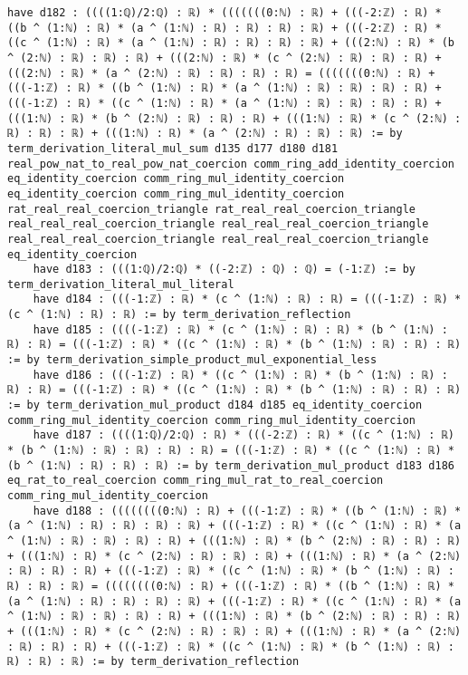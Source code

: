 \documentclass{article}
\begin{document}
\begin{tcolorbox}[colback=white!10, width=\linewidth]
\begin{lstlisting}[language=Lean4]
    have d182 : ((((1:ℚ)/2:ℚ) : ℝ) * (((((((0:ℕ) : ℝ) + (((-2:ℤ) : ℝ) * ((b ^ (1:ℕ) : ℝ) * (a ^ (1:ℕ) : ℝ) : ℝ) : ℝ) : ℝ) + (((-2:ℤ) : ℝ) * ((c ^ (1:ℕ) : ℝ) * (a ^ (1:ℕ) : ℝ) : ℝ) : ℝ) : ℝ) + (((2:ℕ) : ℝ) * (b ^ (2:ℕ) : ℝ) : ℝ) : ℝ) + (((2:ℕ) : ℝ) * (c ^ (2:ℕ) : ℝ) : ℝ) : ℝ) + (((2:ℕ) : ℝ) * (a ^ (2:ℕ) : ℝ) : ℝ) : ℝ) : ℝ) = (((((((0:ℕ) : ℝ) + (((-1:ℤ) : ℝ) * ((b ^ (1:ℕ) : ℝ) * (a ^ (1:ℕ) : ℝ) : ℝ) : ℝ) : ℝ) + (((-1:ℤ) : ℝ) * ((c ^ (1:ℕ) : ℝ) * (a ^ (1:ℕ) : ℝ) : ℝ) : ℝ) : ℝ) + (((1:ℕ) : ℝ) * (b ^ (2:ℕ) : ℝ) : ℝ) : ℝ) + (((1:ℕ) : ℝ) * (c ^ (2:ℕ) : ℝ) : ℝ) : ℝ) + (((1:ℕ) : ℝ) * (a ^ (2:ℕ) : ℝ) : ℝ) : ℝ) := by term_derivation_literal_mul_sum d135 d177 d180 d181 real_pow_nat_to_real_pow_nat_coercion comm_ring_add_identity_coercion eq_identity_coercion comm_ring_mul_identity_coercion eq_identity_coercion comm_ring_mul_identity_coercion rat_real_real_coercion_triangle rat_real_real_coercion_triangle real_real_real_coercion_triangle real_real_real_coercion_triangle real_real_real_coercion_triangle real_real_real_coercion_triangle eq_identity_coercion
    have d183 : (((1:ℚ)/2:ℚ) * ((-2:ℤ) : ℚ) : ℚ) = (-1:ℤ) := by term_derivation_literal_mul_literal
    have d184 : (((-1:ℤ) : ℝ) * (c ^ (1:ℕ) : ℝ) : ℝ) = (((-1:ℤ) : ℝ) * (c ^ (1:ℕ) : ℝ) : ℝ) := by term_derivation_reflection
    have d185 : ((((-1:ℤ) : ℝ) * (c ^ (1:ℕ) : ℝ) : ℝ) * (b ^ (1:ℕ) : ℝ) : ℝ) = (((-1:ℤ) : ℝ) * ((c ^ (1:ℕ) : ℝ) * (b ^ (1:ℕ) : ℝ) : ℝ) : ℝ) := by term_derivation_simple_product_mul_exponential_less
    have d186 : (((-1:ℤ) : ℝ) * ((c ^ (1:ℕ) : ℝ) * (b ^ (1:ℕ) : ℝ) : ℝ) : ℝ) = (((-1:ℤ) : ℝ) * ((c ^ (1:ℕ) : ℝ) * (b ^ (1:ℕ) : ℝ) : ℝ) : ℝ) := by term_derivation_mul_product d184 d185 eq_identity_coercion comm_ring_mul_identity_coercion comm_ring_mul_identity_coercion
    have d187 : ((((1:ℚ)/2:ℚ) : ℝ) * (((-2:ℤ) : ℝ) * ((c ^ (1:ℕ) : ℝ) * (b ^ (1:ℕ) : ℝ) : ℝ) : ℝ) : ℝ) = (((-1:ℤ) : ℝ) * ((c ^ (1:ℕ) : ℝ) * (b ^ (1:ℕ) : ℝ) : ℝ) : ℝ) := by term_derivation_mul_product d183 d186 eq_rat_to_real_coercion comm_ring_mul_rat_to_real_coercion comm_ring_mul_identity_coercion
    have d188 : ((((((((0:ℕ) : ℝ) + (((-1:ℤ) : ℝ) * ((b ^ (1:ℕ) : ℝ) * (a ^ (1:ℕ) : ℝ) : ℝ) : ℝ) : ℝ) + (((-1:ℤ) : ℝ) * ((c ^ (1:ℕ) : ℝ) * (a ^ (1:ℕ) : ℝ) : ℝ) : ℝ) : ℝ) + (((1:ℕ) : ℝ) * (b ^ (2:ℕ) : ℝ) : ℝ) : ℝ) + (((1:ℕ) : ℝ) * (c ^ (2:ℕ) : ℝ) : ℝ) : ℝ) + (((1:ℕ) : ℝ) * (a ^ (2:ℕ) : ℝ) : ℝ) : ℝ) + (((-1:ℤ) : ℝ) * ((c ^ (1:ℕ) : ℝ) * (b ^ (1:ℕ) : ℝ) : ℝ) : ℝ) : ℝ) = ((((((((0:ℕ) : ℝ) + (((-1:ℤ) : ℝ) * ((b ^ (1:ℕ) : ℝ) * (a ^ (1:ℕ) : ℝ) : ℝ) : ℝ) : ℝ) + (((-1:ℤ) : ℝ) * ((c ^ (1:ℕ) : ℝ) * (a ^ (1:ℕ) : ℝ) : ℝ) : ℝ) : ℝ) + (((1:ℕ) : ℝ) * (b ^ (2:ℕ) : ℝ) : ℝ) : ℝ) + (((1:ℕ) : ℝ) * (c ^ (2:ℕ) : ℝ) : ℝ) : ℝ) + (((1:ℕ) : ℝ) * (a ^ (2:ℕ) : ℝ) : ℝ) : ℝ) + (((-1:ℤ) : ℝ) * ((c ^ (1:ℕ) : ℝ) * (b ^ (1:ℕ) : ℝ) : ℝ) : ℝ) : ℝ) := by term_derivation_reflection

\end{lstlisting}
\end{tcolorbox}
\end{document}
